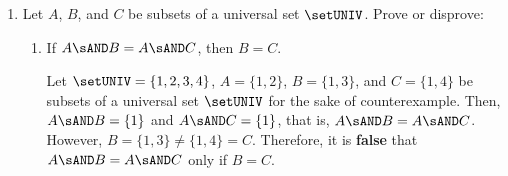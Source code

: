 \begin{enumerate}
\begin{enumerate}
    \item $A \sOR (B \sMINUS A) = A \sOR B$.
    \begin{subprove}
      By definition, the equality $A \sOR (B \sMINUS A) = A \sOR B$ 
      requires showing both directions of subset relations, 
      $A \sOR (B \sMINUS A) \subseteq A \sOR B$ and 
      $A \sOR (B \sMINUS A) \supseteq A \sOR B$.\vspace*{10px}\\
      ($\subseteq$) Let $x \in A \sOR (B \sMINUS A)$ be arbitrary.
      Then $x \in A$ or $x \in B \sMINUS A$.
      If $x \in A$, then $x \in A \sOR B$ as well (trivially).
      If $x \in B \sMINUS A$, then $x \in B$ and $x \notin A$, so $x \in B$, 
      which also (trivially) implies $x \in A \sOR B$.
      In both cases, $x \in A \sOR B$. Hence, $A \sOR (B \sMINUS A) \subseteq A \sOR B$.\vspace*{10px}\\
      ($\supseteq$) Let $x \in A \sOR B$ be arbitrary.
      Then $x \in A$ or $x \in B$. If $x \in A$, then $x \in A \sOR (B \sMINUS A)$ as well (trivially). 
      Next, if $x \in B$, then either $x \in A$ or $x \notin A$.
      \begin{itemize}
        \item If $x \in A$, then $x \in A \sOR (B \sMINUS A)$. (trivial)
        \item If $x \notin A$, then $x \in B \sMINUS A$ by definition of set 
        difference, so $x \in A \sOR (B \sMINUS A)$. (trivial)
      \end{itemize}
      In all cases, $x \in A \sOR (B \sMINUS A)$. Hence, $A \sOR B \subseteq A \sOR (B \sMINUS A)$.\vspace*{10px}\\
      Therefore, by ($\subseteq$) and ($\supseteq$), $A \sOR (B \sMINUS A) = A \sOR B$.
    \end{subprove}
  \end{enumerate}

  \newpage


  \item Let $A$, $B$, and $C$ be subsets of a universal set $\setUNIV$.
  Prove or disprove: 
  \begin{enumerate}
    \item If \(A \sAND B = A \sAND C\), then \(B = C\).
    \begin{subdisprove}
      Let $\setUNIV = \{1, 2, 3, 4\}$, $A = \{1, 2\}$, 
      $B = \{1, 3\}$, and $C = \{1, 4\}$ be subsets of a universal set $\setUNIV$
      for the sake of counterexample.
      Then, $A \sAND B = \{1\}$ and $A \sAND C = \{1\}$, that is, $A \sAND B = A \sAND C$.
      However, $B = \{1, 3\} \neq \{1, 4\} = C$. Therefore, it is \textbf{false} 
      that \(A \sAND B = A \sAND C\) only if \(B = C\).
    \end{subdisprove}
    

\end{enumerate}
\end{enumerate}
